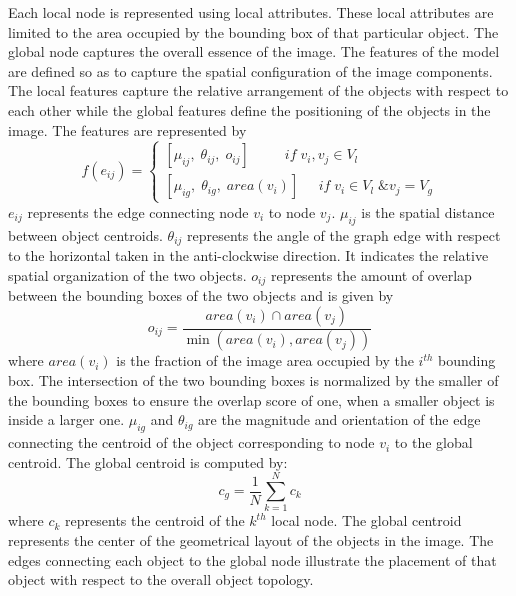 \documentclass[10pt,twocolumn,letterpaper]{article}
\begin{document}
Each local node is represented using local attributes. These local attributes are limited to the area occupied by the bounding box of that particular object. The global node captures the overall essence of the image. The features of the model are defined so as to capture the spatial configuration of the image components. The local features capture the relative arrangement of the objects with respect to each other while the global features define the positioning of the objects in the image. The features are represented by 
\begin{equation}
f({e_{ij}}) = \left\{ {\begin{array}{*{20}{c}}
	{[{\mu _{ij}},\;{\theta _{ij}},\;{o_{ij}}]\;\;\;\;\;\;\;\;\;if\;{v_i},{v_j} \in {V_l}}\\
	{[{\mu _{ig}},\;{\theta _{ig}},\;area({v_i})]\;\;\;\;\;if\;{v_i} \in {V_l}\;\& {v_j} = {V_g}}
	\end{array}} \right.
\end{equation}
$e_{ij}$ represents the edge connecting node $v_i$ to node $v_j$. $\mu_{ij}$ is the spatial distance between object centroids. $\theta_{ij}$ represents the angle of the graph edge with respect to the horizontal taken in the anti-clockwise direction. It indicates the relative spatial organization of the two objects. $o_{ij}$ represents the amount of overlap between the bounding boxes of the two objects and is given by 
\begin{equation}
{o_{ij}} = \frac{{area({v_i}) \cap area({v_j})}}{{\min (area({v_i}),area({v_j}))}}
\end{equation}
where ${area({v_i})}$ is the fraction of the image area occupied by the ${i^{th}}$ bounding box.
The intersection of the two bounding boxes is normalized by the smaller of the bounding boxes to ensure the overlap score of one, when a smaller object is inside a larger one. $\mu_{ig}$ and $\theta_{ig}$ are the magnitude and orientation of the edge connecting the centroid of the object corresponding to node $v_i$ to the global centroid. The global centroid is computed by:
\begin{equation}
{c_g} = \frac{1}{N}\sum\limits_{k = 1}^N {{c_k}}
\end{equation}
where $c_k$ represents the centroid of the $k^{th}$ local node. The global centroid represents the center of the geometrical layout of the objects in the image. The edges connecting each object to the global node illustrate the placement of that object with respect to the overall object topology.
\end{document}
